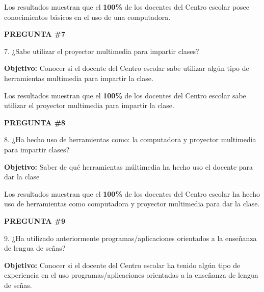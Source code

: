 \documentclass[12pt]{report}%
\begin{document}
Los resultados muestran que el \textbf{ 100\%} de los docentes del Centro escolar posee conocimientos básicos en el uso de una computadora.


\newpage
\textbf{PREGUNTA \#7}

7. ¿Sabe utilizar el proyector multimedia para impartir clases?

\textbf{Objetivo:} Conocer si el docente del Centro escolar sabe utilizar algún tipo de herramientas multimedia para impartir la clase.


\begin{center}
\end{center}


Los resultados muestran que el \textbf{ 100\%} de los docentes del Centro escolar sabe utilizar el proyector multimedia para impartir la clase.

\newpage
\textbf{PREGUNTA \#8}

8. ¿Ha hecho uso de herramientas como: la computadora y proyector multimedia para impartir clases?

\textbf{Objetivo:} Saber de qué herramientas múltimedia ha hecho uso el docente para dar la clase

\begin{center}
\end{center}


Los resultados muestran que el \textbf{ 100\%} de los docentes del Centro escolar ha hecho uso de herramientas como computadora y proyector multimedia para dar la clase.


\newpage
\textbf{PREGUNTA \#9}

9. ¿Ha utilizado anteriormente programas/aplicaciones orientados a la enseñanza de lengua de señas?

\textbf{Objetivo:} Conocer si el docente del Centro escolar ha tenido algún tipo de experiencia en el uso programas/aplicaciones orientadas a la enseñanza de lengua de señas.

\begin{center}
\end{center}
\end{document}
